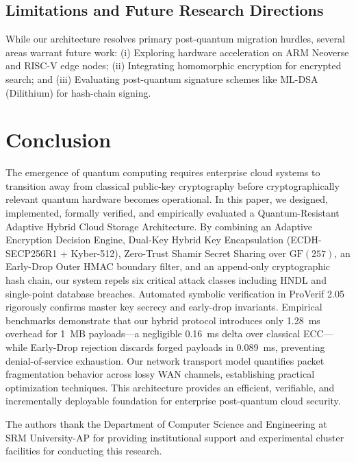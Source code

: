 \documentclass[pdflatex,sn-mathphys,Numbered]{sn-jnl}%
\theoremstyle{thmstyleone}%
\theoremstyle{thmstyletwo}%
\theoremstyle{thmstylethree}%
\begin{document}
\subsection{\textbf{Limitations and Future Research Directions}}
While our architecture resolves primary post-quantum migration hurdles, several areas warrant future work: (i) Exploring hardware acceleration on ARM Neoverse and RISC-V edge nodes; (ii) Integrating homomorphic encryption for encrypted search; and (iii) Evaluating post-quantum signature schemes like ML-DSA (Dilithium) for hash-chain signing.

\section{Conclusion}\label{sec:conclusion}
The emergence of quantum computing requires enterprise cloud systems to transition away from classical public-key cryptography before cryptographically relevant quantum hardware becomes operational. In this paper, we designed, implemented, formally verified, and empirically evaluated a Quantum-Resistant Adaptive Hybrid Cloud Storage Architecture. By combining an Adaptive Encryption Decision Engine, Dual-Key Hybrid Key Encapsulation (ECDH-SECP256R1 + Kyber-512), Zero-Trust Shamir Secret Sharing over $\text{GF}(257)$, an Early-Drop Outer HMAC boundary filter, and an append-only cryptographic hash chain, our system repels six critical attack classes including HNDL and single-point database breaches. Automated symbolic verification in ProVerif 2.05 rigorously confirms master key secrecy and early-drop invariants. Empirical benchmarks demonstrate that our hybrid protocol introduces only 1.28~ms overhead for 1~MB payloads---a negligible 0.16~ms delta over classical ECC---while Early-Drop rejection discards forged payloads in 0.089~ms, preventing denial-of-service exhaustion. Our network transport model quantifies packet fragmentation behavior across lossy WAN channels, establishing practical optimization techniques. This architecture provides an efficient, verifiable, and incrementally deployable foundation for enterprise post-quantum cloud security.

\backmatter

The authors thank the Department of Computer Science and Engineering at SRM University-AP for providing institutional support and experimental cluster facilities for conducting this research.
\end{document}
